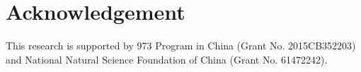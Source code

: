 \section*{Acknowledgement}
This research is supported by 973 Program in China (Grant
No. 2015CB352203) and National Natural Science Foundation
of China (Grant No. 61472242).